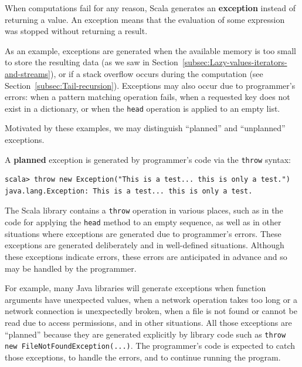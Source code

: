 When computations fail for any reason, Scala generates an \textbf{exception}
instead of returning a value. An exception means that the evaluation
of some expression was stopped without returning a result.

As an example, exceptions are generated when the available memory
is too small to store the resulting data (as we saw in Section~\ref{subsec:Lazy-values-iterators-and-streams}),
or if a stack overflow occurs during the computation (see Section~\ref{subsec:Tail-recursion}).
Exceptions may also occur due to programmer\textsf{'}s errors: when a pattern
matching operation fails, when a requested key does not exist in a
dictionary, or when the \lstinline!head! operation is applied to
an empty list.

Motivated by these examples, we may distinguish \textsf{``}planned\textsf{''}
and \textsf{``}unplanned\textsf{''} exceptions. 

A \textbf{planned} exception is generated by programmer\textsf{'}s code via
the \lstinline!throw! syntax:
\begin{lstlisting}
scala> throw new Exception("This is a test... this is only a test.")
java.lang.Exception: This is a test... this is only a test.
\end{lstlisting}
The Scala library contains a \lstinline!throw! operation in various
places, such as in the code for applying the \lstinline!head! method
to an empty sequence, as well as in other situations where exceptions
are generated due to programmer\textsf{'}s errors. These exceptions are generated
deliberately and in well-defined situations. Although these exceptions
indicate errors, these errors are anticipated in advance and so may
be handled by the programmer.

For example, many Java libraries will generate exceptions when function
arguments have unexpected values, when a network operation takes too
long or a network connection is unexpectedly broken, when a file is
not found or cannot be read due to access permissions, and in other
situations. All those exceptions are \textsf{``}planned\textsf{''} because they are
generated explicitly by library code such as \lstinline!throw new FileNotFoundException(...)!.
The programmer\textsf{'}s code is expected to catch those exceptions, to handle
the errors, and to continue running the program.

